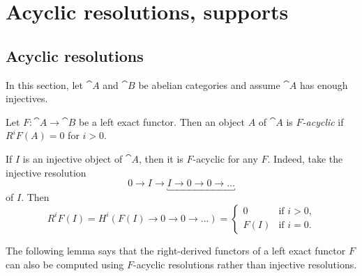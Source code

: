 \chapter{Acyclic resolutions, supports}

\section{Acyclic resolutions}
\noindent
In this section, let \(\cat A\) and \(\cat B\) be abelian categories and assume \(\cat A\) has enough injectives.

\begin{defn}
Let \(F\colon\cat A\to\cat B\) be a left exact functor.
Then an object \(A\) of \(\cat A\) is \emph{\(F\)-acyclic} if \(R^iF(A)=0\) for \(i>0\).
\end{defn}

\begin{exmp}
If \(I\) is an injective object of \(\cat A\), then it is \(F\)-acyclic for any \(F\).
Indeed, take the injective resolution
\[ 0 \to I \to \underbracket{I \to 0 \to 0 \to \ldots} \]
of \(I\).
Then
\[ R^iF(I) = H^i(F(I)\to 0\to 0\to\ldots) =
  \begin{cases}
    0 & \text{if } i>0\text{,} \\
    F(I) & \text{if } i=0\text{.}
  \end{cases}
\]
\end{exmp}

The following lemma says that the right-derived functors of a left exact functor \(F\) can also be computed using \(F\)-acyclic resolutions rather than injective resolutions.

